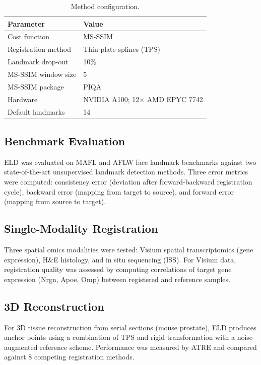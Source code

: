 \documentclass[11pt]{article}
\begin{document}
\begin{table}[h]
\centering
\caption{Method configuration.}
\label{tab:config}
\begin{tabular}{ll}
\toprule
Parameter & Value \\
\midrule
Cost function & MS-SSIM \\
Registration method & Thin-plate splines (TPS) \\
Landmark drop-out & 10\% \\
MS-SSIM window size & 5 \\
MS-SSIM package & PIQA \\
Hardware & NVIDIA A100; 12$\times$ AMD EPYC 7742 \\
Default landmarks & 14 \\
\bottomrule
\end{tabular}
\end{table}

\subsection{Benchmark Evaluation}

ELD was evaluated on MAFL and AFLW face landmark benchmarks against two state-of-the-art unsupervised landmark detection methods. Three error metrics were computed: consistency error (deviation after forward-backward registration cycle), backward error (mapping from target to source), and forward error (mapping from source to target).

\subsection{Single-Modality Registration}

Three spatial omics modalities were tested: Visium spatial transcriptomics (gene expression), H\&E histology, and in situ sequencing (ISS). For Visium data, registration quality was assessed by computing correlations of target gene expression (Nrgn, Apoe, Omp) between registered and reference samples.

\subsection{3D Reconstruction}

For 3D tissue reconstruction from serial sections (mouse prostate), ELD produces anchor points using a combination of TPS and rigid transformation with a noise-augmented reference scheme. Performance was measured by ATRE and compared against 8 competing registration methods.
\end{document}
